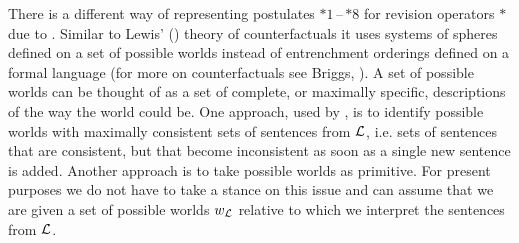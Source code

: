 There is a different way of representing postulates $*1$\,--\,$*8$ for revision operators $*$ due to \citet{g88}. Similar to Lewis' (\citeyear{l73}) theory of counterfactuals it uses systems of spheres defined on a set of possible worlds instead of entrenchment orderings defined on a formal language (for more on counterfactuals see Briggs, ). A set of possible worlds can be thought of as a set of complete, or maximally specific, descriptions of the way the world could be. One approach, used by \citet{g88}, is to identify possible worlds with maximally consistent sets of sentences from $\cal L$, i.e. sets of sentences that are consistent, but that become inconsistent as soon as a single new sentence is added. Another approach is to take possible worlds as primitive. For present purposes we do not have to take a stance on this issue and can assume that we are given a set of possible worlds $w_{\cal L}$ relative to which we interpret the sentences from $\cal L$.


